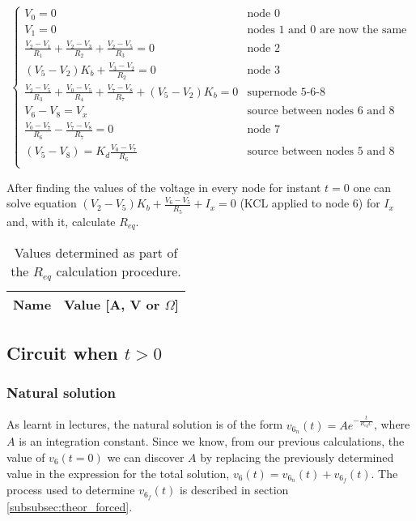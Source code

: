 \begin{equation}
  \begin{cases}
  V_0=0 & \mbox{node 0} \\
  V_1=0 & \mbox{nodes 1 and 0 are now the same} \\
  \frac{V_2-V_1}{R_1}+\frac{V_2-V_3}{R_2}+\frac{V_2-V_5}{R_3} = 0 & \mbox{node 2} \\
  (V_5-V_2)K_b + \frac{V_3-V_2}{R_2} = 0 & \mbox{node 3} \\
  \frac{V_2-V_5}{R_3} + \frac{V_0-V_5}{R_4} + \frac{V_7-V_8}{R_7} + (V_5-V_2)K_b = 0 & \mbox{supernode 5-6-8} \\ 
  V_6-V_8 = V_x & \mbox{source between nodes 6 and 8} \\
  \frac{V_0-V_7}{R_6} - \frac{V_7-V_8}{R_7} = 0 & \mbox{node 7} \\
  (V_5-V_8) = K_d \frac{V_0-V_7}{R_6} & \mbox{source between nodes 5 and 8} \\
  \end{cases}
\end{equation}

After finding the values of the voltage in every node for instant $t=0$ one can solve equation $(V_2-V_5)K_b + \frac{V_6-V_5}{R_5} + I_x = 0$ (KCL applied to node 6) for $I_x$ and, with it, calculate $R_{eq}$.


\begin{table}[H]
  \centering
  \begin{tabular}{|c|c|}
    \hline    
    {\bf Name} & {\bf Value [A, V or $\Omega$]} \\ \hline
    
  \end{tabular}
  \caption{Values determined as part of the $R_{eq}$ calculation procedure.}
  \label{tab:t=0}
\end{table}



\subsection{Circuit when $t>0$}

\subsubsection{Natural solution}  %
As learnt in lectures, the natural solution is of the form $v_{6_{n}}(t) = A e^{-\frac{t}{R_{eq}C}}$, where $A$ is an integration constant.
Since we know, from our previous calculations, the value of $v_{6}(t=0)$ we can discover $A$ by replacing the previously determined value in the expression for the total solution, $v_6(t) = v_{6_n}(t) + v_{6_f}(t)$. The process used to determine $v_{6_f}(t)$ is described in section \ref{subsubsec:theor_forced}. 

